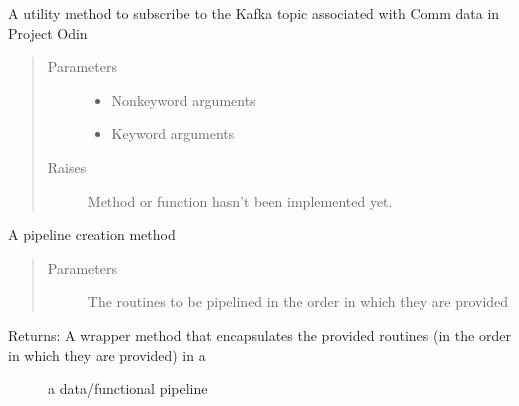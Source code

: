\documentclass[letterpaper,10pt,english]{sphinxmanual}
\begin{document}

\begin{fulllineitems}
\label{\detokenize{Forge:Forge.comm_subscribe}}
\sphinxAtStartPar
A utility method to subscribe to the Kafka topic associated with Comm data in Project Odin
\begin{quote}\begin{description}
\item[{Parameters}] \leavevmode\begin{itemize}
\item {} 
\sphinxAtStartPar
{} \textendash{} Non\sphinxhyphen{}keyword arguments

\item {} 
\sphinxAtStartPar
{} \textendash{} Keyword arguments

\end{itemize}

\item[{Raises}] \leavevmode
\sphinxAtStartPar
{} \textendash{} Method or function hasn’t been implemented yet.

\end{description}\end{quote}

\end{fulllineitems}


\begin{fulllineitems}
\label{\detokenize{Forge:Forge.connect}}
\sphinxAtStartPar
A pipeline creation method
\begin{quote}\begin{description}
\item[{Parameters}] \leavevmode
\sphinxAtStartPar
{} \textendash{} The routines to be pipelined in the order in which they are provided

\end{description}\end{quote}
\begin{description}
\item[{Returns: A wrapper method that encapsulates the provided routines (in the order in which they are provided) in a}] \leavevmode
\sphinxAtStartPar
a data/functional pipeline

\end{description}

\end{fulllineitems}
\end{document}
